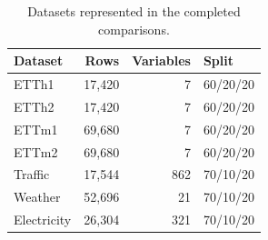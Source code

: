 \begin{table}[t]
\centering\small
\caption{Datasets represented in the completed comparisons.}
\label{tab:data}
\begin{tabular*}{\linewidth}{@{\extracolsep{\fill}}lrrl@{}}
\toprule
Dataset & Rows & Variables & Split \\
\midrule
ETTh1 & 17,420 & 7 & 60/20/20 \\
ETTh2 & 17,420 & 7 & 60/20/20 \\
ETTm1 & 69,680 & 7 & 60/20/20 \\
ETTm2 & 69,680 & 7 & 60/20/20 \\
Traffic & 17,544 & 862 & 70/10/20 \\
Weather & 52,696 & 21 & 70/10/20 \\
Electricity & 26,304 & 321 & 70/10/20 \\
\bottomrule
\end{tabular*}
\end{table}
